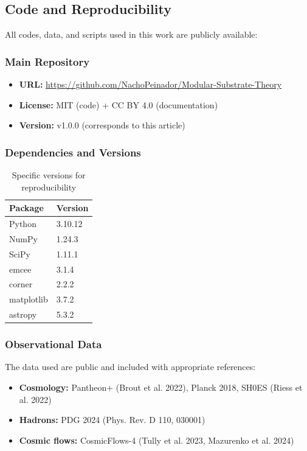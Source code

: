 \documentclass[11pt, a4paper]{article}
\theoremstyle{plain}
\theoremstyle{definition}
\begin{document}
\subsection{Code and Reproducibility}
\label{app:reproducibility}

All codes, data, and scripts used in this work are publicly available:

\subsubsection{Main Repository}
\begin{itemize}
    \item \textbf{URL:} \url{https://github.com/NachoPeinador/Modular-Substrate-Theory}
    \item \textbf{License:} MIT (code) + CC BY 4.0 (documentation)
    \item \textbf{Version:} v1.0.0 (corresponds to this article)
\end{itemize}

\subsubsection{Dependencies and Versions}
\begin{table}[H]
\centering
\caption{Specific versions for reproducibility}
\label{tab:dependencies}
\begin{tabular}{ll}
\toprule
\textbf{Package} & \textbf{Version} \\
\midrule
Python & 3.10.12 \\
NumPy & 1.24.3 \\
SciPy & 1.11.1 \\
emcee & 3.1.4 \\
corner & 2.2.2 \\
matplotlib & 3.7.2 \\
astropy & 5.3.2 \\
\bottomrule
\end{tabular}
\end{table}

\subsubsection{Observational Data}
The data used are public and included with appropriate references:
\begin{itemize}
    \item \textbf{Cosmology:} Pantheon+ (Brout et al. 2022), Planck 2018, SH0ES (Riess et al. 2022)
    \item \textbf{Hadrons:} PDG 2024 (Phys. Rev. D 110, 030001)
    \item \textbf{Cosmic flows:} CosmicFlows-4 (Tully et al. 2023, Mazurenko et al. 2024)
\end{itemize}
\end{document}
